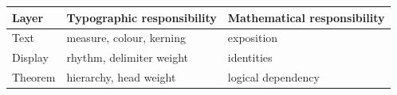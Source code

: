 \documentclass[11pt]{memoir}
\begin{document}
\begin{center}
\begin{tabular}{lll}
\toprule
Layer & Typographic responsibility & Mathematical responsibility\\
\midrule
Text & measure, colour, kerning & exposition\\
Display & rhythm, delimiter weight & identities\\
Theorem & hierarchy, head weight & logical dependency\\
\bottomrule
\end{tabular}
\end{center}

\begin{biblist}
\end{biblist}
\end{document}
